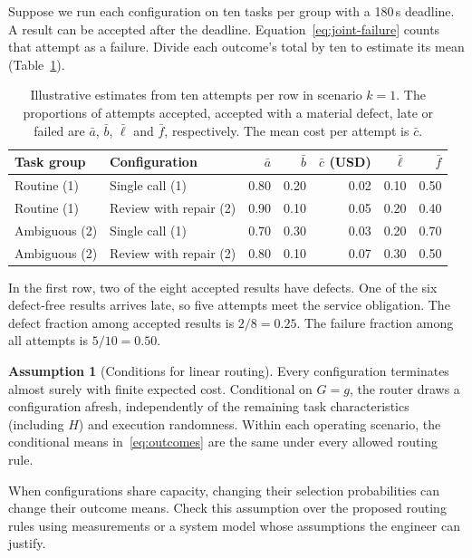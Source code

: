 \documentclass[11pt,reqno]{amsart}
\theoremstyle{definition}
\newtheorem{assumption}[theorem]{Assumption}
\theoremstyle{remark}
\begin{document}
Suppose we run each configuration on ten tasks per group with a 180\,s deadline. A result can be accepted after the deadline. Equation~\eqref{eq:joint-failure} counts that attempt as a failure.
Divide each outcome's total by ten to estimate its mean (Table~\ref{tab:outcome-example}).

\begin{table}[H]
\centering
\small
\setlength{\tabcolsep}{5pt}
\begin{tabular}{@{}llrrrrr@{}}
\toprule
Task group & Configuration &
$\bar a$ & $\bar b$ & $\bar c$ (USD) & $\bar\ell$ & $\bar f$\\
\midrule
Routine (1)   & Single call (1)        & 0.80 & 0.20 & 0.02 & 0.10 & 0.50\\
Routine (1)   & Review with repair (2) & 0.90 & 0.10 & 0.05 & 0.20 & 0.40\\
Ambiguous (2) & Single call (1)        & 0.70 & 0.30 & 0.03 & 0.20 & 0.70\\
Ambiguous (2) & Review with repair (2) & 0.80 & 0.10 & 0.07 & 0.30 & 0.50\\
\bottomrule
\end{tabular}
\caption{Illustrative estimates from ten attempts per row in scenario $k=1$.
The proportions of attempts accepted, accepted with a material defect, late or failed are $\bar a$, $\bar b$, $\bar\ell$ and $\bar f$, respectively. The mean cost per attempt is $\bar c$.}
\label{tab:outcome-example}
\end{table}

In the first row, two of the eight accepted results have defects. One of the six defect-free results arrives late, so five attempts meet the service obligation. The defect fraction among accepted results is $2/8=0.25$. The failure fraction among all attempts is $5/10=0.50$.

\begin{assumption}[Conditions for linear routing]\label{ass:deployment}
Every configuration terminates almost surely with finite expected cost.
Conditional on $G=g$, the router draws a configuration afresh, independently of the remaining task characteristics (including $H$) and execution randomness.
Within each operating scenario, the conditional means in~\eqref{eq:outcomes} are the same under every allowed routing rule.
\end{assumption}

When configurations share capacity, changing their selection probabilities can change their outcome means. Check this assumption over the proposed routing rules using measurements or a system model whose assumptions the engineer can justify.
\end{document}
